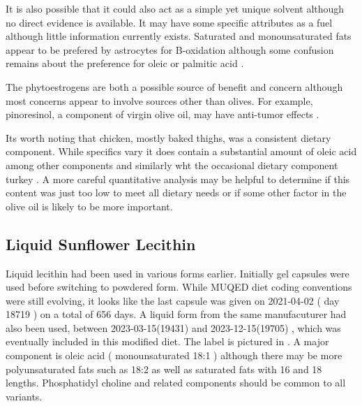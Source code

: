 It is also possible that it could also act
as a simple yet unique solvent although no direct evidence is available. 
It may have some specific attributes as a fuel although little
information currently exists. 
Saturated and monounsaturated fats appear to be prefered by astrocytes
for B-oxidation although some confusion remains about the preference
for oleic or palmitic acid \cite{https://doi.org/10.1111/gtc.13144}.

The phytoestrogens are both a possible source of benefit and concern
\cite{Sridevi_Naveen_Karnam_Beneficiary_Adverse_Effects_2021}
\cite{WHITTEN1995771S} although most concerns appear to involve
sources other than olives.
For example, pinoresinol, a component of virgin olive
oil, may have anti-tumor effects
\cite{LopezBiedma_SanchezQuesada_Beltran_Phytoestrogen_pinoresinol_exerts_antitumor_2016}.

Its worth noting that chicken, mostly baked thighs, was a consistent
dietary component. While specifics vary it does contain a substantial
amount of oleic acid among other components
\cite{Abdulla_Loh_Akit_Fatty_Acid_Profile_Cholesterol_2015}
\cite{SALMON1973302}
\cite{SAHASRABUDHE_DELORME_WOOD_Neutral_Polar_Lipids_1985}
and similarly wht  the occasional dietary
component turkey
\cite{BOIUx0218badchar_CIOBANU_LAZAR_Researches_Regarding_Fatty_2014}
\cite{19722081}
. A more careful quantitative analysis may be helpful to determine
if this content was just too low to meet all dietary needs or if
some other factor in the olive oil is likely to be more important.

\subsection{Liquid Sunflower Lecithin }

 Liquid lecithin had been used in various forms earlier.
Initially gel capsules were used before switching to powdered
form. 
While MUQED diet coding conventions were still evolving, it looks like the
last capsule was given on 2021-04-02 ( day 18719 ) 
on a total of 656 days.
A liquid form from the same manufacuturer had
also been used, between 2023-03-15(19431) and
2023-12-15(19705) , which  was eventually included
in this modified diet. The label is pictured in  .
A major component is oleic acid
\cite{GUIOTTO201557} ( monounsaturated 18:1 )
although there may be more polyunsaturated fats
such as 18:2 as well as saturated fats with 16 and 18
lengths. 
Phosphatidyl choline and related components
should be common to all variants.

